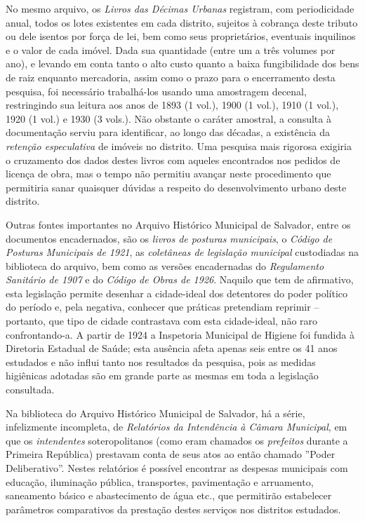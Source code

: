 No mesmo arquivo, os \textit{Livros das Décimas Urbanas} registram, com periodicidade anual, todos os lotes existentes em cada distrito, sujeitos à cobrança deste tributo ou dele isentos por força de lei, bem como seus proprietários, eventuais inquilinos e o valor de cada imóvel. Dada sua quantidade (entre um a três volumes por ano), e levando em conta tanto o alto custo quanto a baixa fungibilidade dos bens de raiz enquanto mercadoria, assim como o prazo para o encerramento desta pesquisa, foi necessário trabalhá-los usando uma amostragem decenal, restringindo sua leitura aos anos de 1893 (1 vol.), 1900 (1 vol.), 1910 (1 vol.), 1920 (1 vol.) e 1930 (3 vols.). Não obstante o caráter amostral, a consulta à documentação serviu para identificar, ao longo das décadas, a existência da \textit{retenção especulativa} de imóveis no distrito. Uma pesquisa mais rigorosa exigiria o cruzamento dos dados destes livros com aqueles encontrados nos pedidos de licença de obra, mas o tempo não permitiu avançar neste procedimento que permitiria sanar quaisquer dúvidas a respeito do desenvolvimento urbano deste distrito.

Outras fontes importantes no Arquivo Histórico Municipal de Salvador, entre os documentos encadernados, são os \textit{livros de posturas municipais}, o \textit{Código de Posturas Municipais de 1921}, as \textit{coletâneas de legislação municipal} custodiadas na biblioteca do arquivo, bem como as versões encadernadas do \textit{Regulamento Sanitário de 1907} e do \textit{Código de Obras de 1926}. Naquilo que tem de afirmativo, esta legislação permite desenhar a cidade-ideal dos detentores do poder político do período e, pela negativa, conhecer que práticas pretendiam reprimir -- portanto, que tipo de cidade contrastava com esta cidade-ideal, não raro confrontando-a. A partir de 1924 a Inspetoria Municipal de Higiene foi fundida à Diretoria Estadual de Saúde; esta ausência afeta apenas seis entre os 41 anos estudados e não influi tanto nos resultados da pesquisa, pois as medidas higiênicas adotadas são em grande parte as mesmas em toda a legislação consultada.

Na biblioteca do Arquivo Histórico Municipal de Salvador, há a série, infelizmente incompleta, de \textit{Relatórios da Intendência à Câmara Municipal}, em que os \textit{intendentes} soteropolitanos (como eram chamados os \textit{prefeitos} durante a Primeira República) prestavam conta de seus atos ao então chamado ''Poder Deliberativo''. Nestes relatórios é possível encontrar as despesas municipais com educação, iluminação pública, transportes, pavimentação e arruamento, saneamento básico e abastecimento de água etc., que permitirão estabelecer parâmetros comparativos da prestação destes serviços nos distritos estudados.

